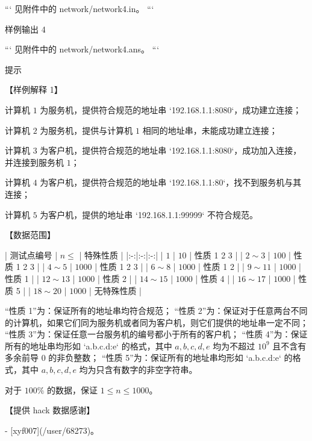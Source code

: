 \documentclass[12pt,twiside,a4paper]{ctexbook}
\numberwithin{chapter}{part}
\begin{document}
```
见附件中的 network/network4.in。
```

 样例输出 4

```
见附件中的 network/network4.ans。
```

 提示

【样例解释 1】

计算机 $1$ 为服务机，提供符合规范的地址串 `192.168.1.1:8080`，成功建立连接；

计算机 $2$ 为服务机，提供与计算机 $1$ 相同的地址串，未能成功建立连接；

计算机 $3$ 为客户机，提供符合规范的地址串 `192.168.1.1:8080`，成功加入连接，并连接到服务机 $1$；

计算机 $4$ 为客户机，提供符合规范的地址串 `192.168.1.1:80`，找不到服务机与其连接；

计算机 $5$ 为客户机，提供的地址串 `192.168.1.1:99999` 不符合规范。

【数据范围】

| 测试点编号 | $n \le$ | 特殊性质 |
|:-:|:-:|:-:|
| $1$ | $10$ | 性质 1 2 3 |
| $2 \sim 3$ | $100$ | 性质 1 2 3 |
| $4 \sim 5$ | $1000$ | 性质 1 2 3 |
| $6 \sim 8$ | $1000$ | 性质 1 2 |
| $9 \sim 11$ | $1000$ | 性质 1 |
| $12 \sim 13$ | $1000$ | 性质 2 |
| $14 \sim 15$ | $1000$ | 性质 4 |
| $16 \sim 17$ | $1000$ | 性质 5 |
| $18 \sim 20$ | $1000$ | 无特殊性质 |

“性质 1”为：保证所有的地址串均符合规范；  
“性质 2”为：保证对于任意两台不同的计算机，如果它们同为服务机或者同为客户机，则它们提供的地址串一定不同；  
“性质 3”为：保证任意一台服务机的编号都小于所有的客户机；  
“性质 4”为：保证所有的地址串均形如 `a.b.c.d:e` 的格式，其中 $a, b, c, d, e$ 均为不超过 ${10}^9$ 且不含有多余前导 $0$ 的非负整数；  
“性质 5”为：保证所有的地址串均形如 `a.b.c.d:e` 的格式，其中 $a, b, c, d, e$ 均为只含有数字的非空字符串。

对于 $100 \%$ 的数据，保证 $1 \le n \le 1000$。

【提供 hack 数据感谢】  

- [xyf007](/user/68273)。
\end{document}
